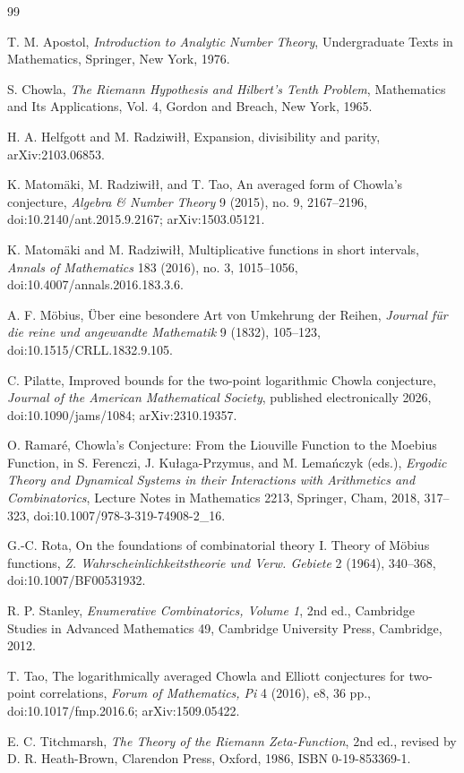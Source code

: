 \documentclass[11pt]{amsart}
\numberwithin{equation}{section}
\theoremstyle{plain}
\theoremstyle{definition}
\theoremstyle{remark}
\begin{document}
\begin{thebibliography}{99}

T. M. Apostol,
\emph{Introduction to Analytic Number Theory},
Undergraduate Texts in Mathematics, Springer, New York, 1976.

S. Chowla,
\emph{The Riemann Hypothesis and Hilbert's Tenth Problem},
Mathematics and Its Applications, Vol. 4, Gordon and Breach, New York, 1965.

H. A. Helfgott and M. Radziwi{\l}{\l},
Expansion, divisibility and parity,
arXiv:2103.06853.

K. Matomäki, M. Radziwi{\l}{\l}, and T. Tao,
An averaged form of Chowla's conjecture,
\emph{Algebra \& Number Theory} 9 (2015), no. 9, 2167--2196,
doi:10.2140/ant.2015.9.2167; arXiv:1503.05121.

K. Matomäki and M. Radziwi{\l}{\l},
Multiplicative functions in short intervals,
\emph{Annals of Mathematics} 183 (2016), no. 3, 1015--1056,
doi:10.4007/annals.2016.183.3.6.

A. F. Möbius,
Über eine besondere Art von Umkehrung der Reihen,
\emph{Journal für die reine und angewandte Mathematik} 9 (1832), 105--123,
doi:10.1515/CRLL.1832.9.105.

C. Pilatte,
Improved bounds for the two-point logarithmic Chowla conjecture,
\emph{Journal of the American Mathematical Society}, published electronically 2026,
doi:10.1090/jams/1084; arXiv:2310.19357.

O. Ramaré,
Chowla's Conjecture: From the Liouville Function to the Moebius Function,
in S. Ferenczi, J. Kułaga-Przymus, and M. Lemańczyk (eds.),
\emph{Ergodic Theory and Dynamical Systems in their Interactions with Arithmetics and Combinatorics},
Lecture Notes in Mathematics 2213, Springer, Cham, 2018, 317--323,
doi:10.1007/978-3-319-74908-2\_16.

G.-C. Rota,
On the foundations of combinatorial theory I. Theory of Möbius functions,
\emph{Z. Wahrscheinlichkeitstheorie und Verw. Gebiete} 2 (1964), 340--368,
doi:10.1007/BF00531932.

R. P. Stanley,
\emph{Enumerative Combinatorics, Volume 1},
2nd ed., Cambridge Studies in Advanced Mathematics 49,
Cambridge University Press, Cambridge, 2012.

T. Tao,
The logarithmically averaged Chowla and Elliott conjectures for two-point correlations,
\emph{Forum of Mathematics, Pi} 4 (2016), e8, 36 pp.,
doi:10.1017/fmp.2016.6; arXiv:1509.05422.

E. C. Titchmarsh,
\emph{The Theory of the Riemann Zeta-Function},
2nd ed., revised by D. R. Heath-Brown,
Clarendon Press, Oxford, 1986, ISBN 0-19-853369-1.

\end{thebibliography}
\end{document}
